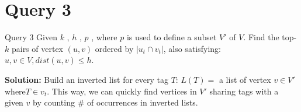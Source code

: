 

\section{Query 3}
\begin{frame}{Query 3}
Given $k$ , $h$ , $p$ , where $p$ is used to define a subset $V′$ of $V$. Find
the top-$k$ pairs of vertex $(u, v)$ ordered by $|u_t \cap v_t|$, also
satisfying: $u, v \in V,  dist (u, v) \le h$.

\textbf{Solution:} Build an inverted
list for every tag $T$: $L(T) = $ a list of vertex $v \in V′ $where$ T \in v_t $.
This way, we can quickly find vertices in $V′$ sharing tags with a
given $v$ by counting \# of occurrences in inverted lists.
\end{frame}
